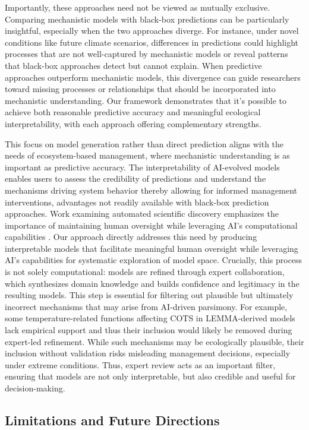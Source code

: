 Importantly, these approaches need not be viewed as mutually exclusive. Comparing mechanistic models with black-box predictions can be particularly insightful, especially when the two approaches diverge. For instance, under novel conditions like future climate scenarios, differences in predictions could highlight processes that are not well-captured by mechanistic models or reveal patterns that black-box approaches detect but cannot explain. When predictive approaches outperform mechanistic models, this divergence can guide researchers toward missing processes or relationships that should be incorporated into mechanistic understanding. Our framework demonstrates that it's possible to achieve both reasonable predictive accuracy and meaningful ecological interpretability, with each approach offering complementary strengths.

This focus on model generation rather than direct prediction aligns with the needs of ecosystem-based management, where mechanistic understanding is as important as predictive accuracy. The interpretability of AI-evolved models enables users to assess the credibility of predictions and understand the mechanisms driving system behavior thereby allowing for informed management interventions, advantages not readily available with black-box prediction approaches. Work examining automated scientific discovery emphasizes the importance of maintaining human oversight while leveraging AI's computational capabilities \citep{kramer2023automated,Spillias2024}. Our approach directly addresses this need by producing interpretable models that facilitate meaningful human oversight while leveraging AI's capabilities for systematic exploration of model space. Crucially, this process is not solely computational: models are refined through expert collaboration, which synthesizes domain knowledge and builds confidence and legitimacy in the resulting models. This step is essential for filtering out plausible but ultimately incorrect mechanisms that may arise from AI-driven parsimony. For example, some temperature-related functions affecting COTS in LEMMA-derived models lack empirical support and thus their inclusion would likely be removed during expert-led refinement. While such mechanisms may be ecologically plausible, their inclusion without validation risks misleading management decisions, especially under extreme conditions. Thus, expert review acts as an important filter, ensuring that models are not only interpretable, but also credible and useful for decision-making.

\subsection{Limitations and Future Directions}

